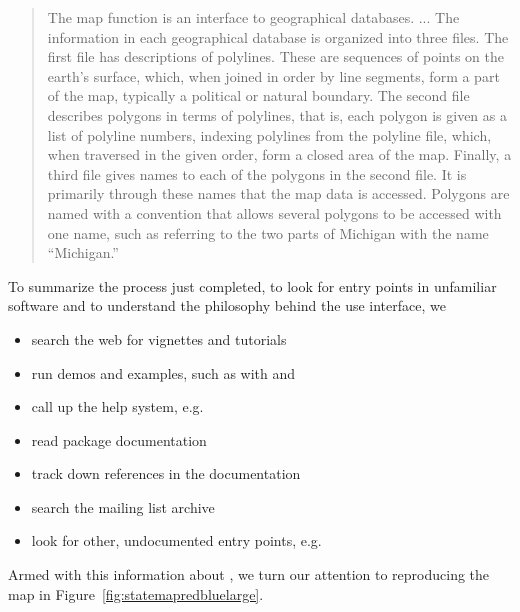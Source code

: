\begin{quote}
The map function is an interface to geographical databases. 
...
The information in each geographical database is organized into three files. 
The first file has descriptions of polylines. 
These are sequences of points on the earth's surface, which, when joined in order 
by line segments, form a part of the map, typically a political or natural boundary. 
The second file describes polygons in terms of polylines, 
that is, each polygon is given as a list of polyline numbers, 
indexing polylines from the polyline file, which, 
when traversed in the given order, form a closed area of the map. 
Finally, a third file gives names to each of the polygons in the second file. 
It is primarily through these names that the map data is accessed. 
Polygons are named with a convention that allows several polygons to be accessed with
one name, such as referring to the two parts of Michigan with the name ``Michigan.''
\end{quote}

To summarize the process just completed, to look for entry points
in unfamiliar software and to understand the philosophy behind
the use interface, we  

\begin{itemize}
\item search the web for vignettes and tutorials 
\item run demos and examples, such as with 
and 
\item call up the help system, e.g. 
\item read package documentation 
\item track down references in the documentation 
\item search the mailing list archive
\item look for other, undocumented entry points, e.g. 
\end{itemize}

Armed with this information about , 
we turn our attention to reproducing the map in 
Figure~\ref{fig:statemapredbluelarge}.

